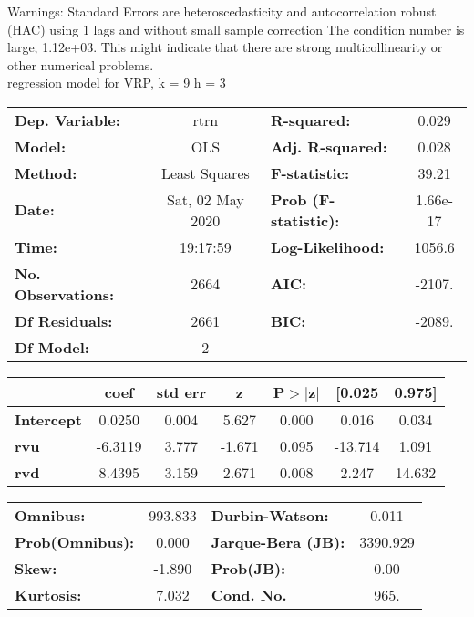Warnings: \newline
 [1] Standard Errors are heteroscedasticity and autocorrelation robust (HAC) using 1 lags and without small sample correction \newline
 [2] The condition number is large, 1.12e+03. This might indicate that there are \newline
 strong multicollinearity or other numerical problems.\\ 

regression model for VRP, k = 9 h = 3\begin{center}
\begin{tabular}{lclc}
\toprule
\textbf{Dep. Variable:}    &       rtrn       & \textbf{  R-squared:         } &     0.029   \\
\textbf{Model:}            &       OLS        & \textbf{  Adj. R-squared:    } &     0.028   \\
\textbf{Method:}           &  Least Squares   & \textbf{  F-statistic:       } &     39.21   \\
\textbf{Date:}             & Sat, 02 May 2020 & \textbf{  Prob (F-statistic):} &  1.66e-17   \\
\textbf{Time:}             &     19:17:59     & \textbf{  Log-Likelihood:    } &    1056.6   \\
\textbf{No. Observations:} &        2664      & \textbf{  AIC:               } &    -2107.   \\
\textbf{Df Residuals:}     &        2661      & \textbf{  BIC:               } &    -2089.   \\
\textbf{Df Model:}         &           2      & \textbf{                     } &             \\
\bottomrule
\end{tabular}
\begin{tabular}{lcccccc}
                   & \textbf{coef} & \textbf{std err} & \textbf{z} & \textbf{P$> |$z$|$} & \textbf{[0.025} & \textbf{0.975]}  \\
\midrule
\textbf{Intercept} &       0.0250  &        0.004     &     5.627  &         0.000        &        0.016    &        0.034     \\
\textbf{rvu}       &      -6.3119  &        3.777     &    -1.671  &         0.095        &      -13.714    &        1.091     \\
\textbf{rvd}       &       8.4395  &        3.159     &     2.671  &         0.008        &        2.247    &       14.632     \\
\bottomrule
\end{tabular}
\begin{tabular}{lclc}
\textbf{Omnibus:}       & 993.833 & \textbf{  Durbin-Watson:     } &    0.011  \\
\textbf{Prob(Omnibus):} &   0.000 & \textbf{  Jarque-Bera (JB):  } & 3390.929  \\
\textbf{Skew:}          &  -1.890 & \textbf{  Prob(JB):          } &     0.00  \\
\textbf{Kurtosis:}      &   7.032 & \textbf{  Cond. No.          } &     965.  \\
\bottomrule
\end{tabular}
\end{center}


